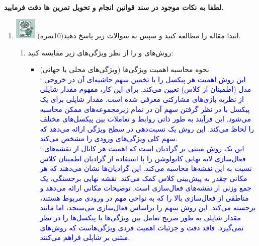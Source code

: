 \documentclass[12pt]{article}
\begin{document}
\fontsize{12pt}{14pt}\selectfont



\\
{\fontsize{14}{22}\selectfont \textbf{لطفا به نکات موجود در سند قوانین انجام و تحویل تمرین ها دقت فرمایید. }}

\begin{enumerate}

    \section*{سوالات تئوری}
    \item \includegraphics[width=1cm]{figs/Allowed_with_contributino.jpg}
     ابتدا مقاله \href{https://arxiv.org/pdf/2208.03608}{} را مطالعه کنید و سپس به سوالات زیر پاسخ دهید(10نمره).\\
     \begin{enumerate}
         \item روش‌های  و  را از نظر ویژگی‌های زیر مقایسه کنید:
         \begin{itemize}
             \item نحوه محاسبه اهمیت ویژگی‌ها (ویژگی‌های محلی یا جهانی)\\
             \textcolor{blue}{
             : این روش اهمیت هر پیکسل را با تخمین سهم حاشیه‌ای آن در خروجی مدل (اطمینان از کلاس) تعیین می‌کند. برای این کار، مفهوم مقدار شاپلی از نظریه بازی‌های مشارکتی معرفی شده است. مقدار شاپلی برای یک پیکسل با در نظر گرفتن سهم آن در تمام زیرمجموعه‌های ممکن محاسبه می‌شود. این فرآیند به طور ذاتی روابط و تعاملات بین پیکسل‌های مختلف را لحاظ می‌کند. این روش یک نسبت‌دهی در سطح ویژگی ارائه می‌دهد که سهم کلی ویژگی‌های ورودی را مشخص می‌کند.}\\
             \textcolor{blue}{
            : این یک روش مبتنی بر گرادیان است که اهمیت هر کانال از نقشه‌های فعال‌سازی لایه نهایی کانولوشن را با استفاده از گرادیان اطمینان کلاس نسبت به این نقشه‌ها محاسبه می‌کند. این گرادیان‌ها نشان می‌دهند که هر مکانی چقدر به پیش‌بینی کلاس کمک می‌کند. نقشه نهایی برجستگی، یک جمع وزنی از نقشه‌های فعال‌سازی است.  توضیحات مکانی ارائه می‌دهد و مناطقی از فعال‌سازی بالا را که به نواحی مهم در ورودی مربوط هستند، برجسته می‌کند. این روش سهم را براساس فعال‌سازی می‌سنجد، اما مانند مقدار شاپلی به طور صریح تعامل بین ویژگی‌ها یا پیکسل‌ها را در نظر نمی‌گیرد.  فاقد دقت و جزئیات اهمیت فردی ویژگی‌هاست که روش‌های مبتنی بر شاپلی فراهم می‌کنند.}
            

\end{itemize}
\end{enumerate}
\end{enumerate}
\end{document}
